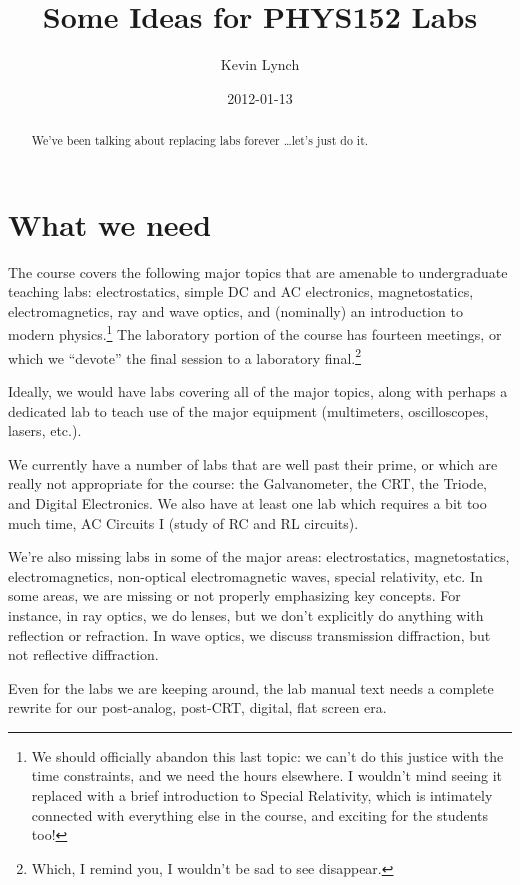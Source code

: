 \documentclass[12pt]{article}
\title{Some Ideas for PHYS152 Labs}
\author{Kevin Lynch}
\date{2012-01-13}
\begin{document}
\maketitle

\begin{abstract}
  We've been talking about replacing labs forever \ldots let's just do
  it.
\end{abstract}

\section{What we need}
\label{sec:need}

The course covers the following major topics that are amenable to
undergraduate teaching labs: electrostatics, simple DC and AC
electronics, magnetostatics, electromagnetics, ray and wave optics,
and (nominally) an introduction to modern physics.\footnote{We should
  officially abandon this last topic: we can't do this justice with
  the time constraints, and we need the hours elsewhere.  I wouldn't
  mind seeing it replaced with a brief introduction to Special
  Relativity, which is intimately connected with everything else in
  the course, and exciting for the students too!}  The laboratory
portion of the course has fourteen meetings, or which we ``devote''
the final session to a laboratory final.\footnote{Which, I remind you,
  I wouldn't be sad to see disappear.}

Ideally, we would have labs covering all of the major topics, along
with perhaps a dedicated lab to teach use of the major equipment
(multimeters, oscilloscopes, lasers, etc.).

We currently have a number of labs that are well past their prime, or
which are really not appropriate for the course: the Galvanometer, the
CRT, the Triode, and Digital Electronics.  We also have at least one
lab which requires a bit too much time, AC Circuits I (study of RC and
RL circuits).  

We're also missing labs in some of the major areas: electrostatics,
magnetostatics, electromagnetics, non-optical electromagnetic waves,
special relativity, etc.  In some areas, we are missing or not
properly emphasizing key concepts.  For instance, in ray optics, we
do lenses, but we don't explicitly do anything with reflection or
refraction.  In wave optics, we discuss transmission diffraction, but
not reflective diffraction.

Even for the labs we are keeping around, the lab manual text needs a
complete rewrite for our post-analog, post-CRT, digital, flat screen
era.
\end{document}
